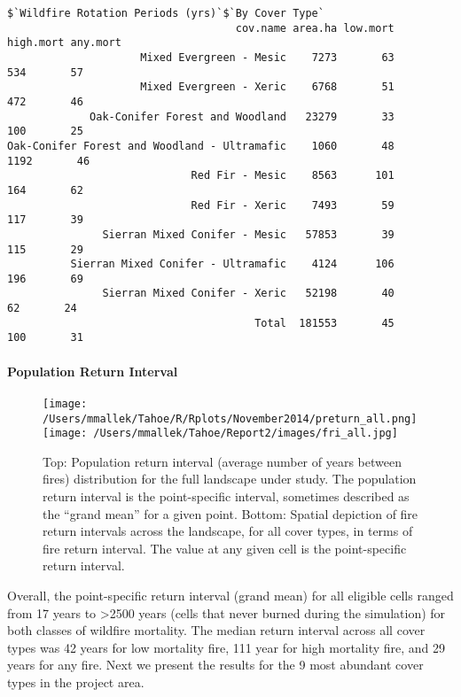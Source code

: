 \begin{verbatim}
$`Wildfire Rotation Periods (yrs)`$`By Cover Type`
                                    cov.name area.ha low.mort high.mort any.mort
                     Mixed Evergreen - Mesic    7273       63       534       57
                     Mixed Evergreen - Xeric    6768       51       472       46
             Oak-Conifer Forest and Woodland   23279       33       100       25
Oak-Conifer Forest and Woodland - Ultramafic    1060       48      1192       46
                             Red Fir - Mesic    8563      101       164       62
                             Red Fir - Xeric    7493       59       117       39
               Sierran Mixed Conifer - Mesic   57853       39       115       29
          Sierran Mixed Conifer - Ultramafic    4124      106       196       69
               Sierran Mixed Conifer - Xeric   52198       40        62       24
                                       Total  181553       45       100       31
\end{verbatim}

\paragraph{Population Return Interval}
\begin{figure}
\centering
\texttt{[image: /Users/mmallek/Tahoe/R/Rplots/November2014/preturn\_all.png]}
\texttt{[image: /Users/mmallek/Tahoe/Report2/images/fri\_all.jpg]}
\caption{Top: Population return interval (average number of years between fires) distribution for the full landscape under study. The population return interval is the point-specific interval, sometimes described as the ``grand mean'' for a given point. Bottom: Spatial depiction of fire return intervals across the landscape, for all cover types, in terms of fire return interval. The value at any given cell is the point-specific return interval.}
\label{preturn_all}
\end{figure}


Overall, the point-specific return interval (grand mean) for all eligible cells ranged from 17 years to \textgreater 2500 years (cells that never burned during the simulation) for both classes of wildfire mortality. The median return interval across all cover types was 42 years for low mortality fire, 111 year for high mortality fire, and 29 years for any fire. Next we present the results for the 9 most abundant cover types in the project area.

